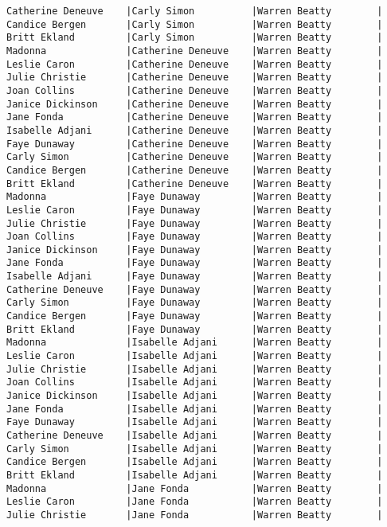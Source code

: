 \documentclass{article}
\begin{document}
\begin{verbatim}
Catherine Deneuve    |Carly Simon          |Warren Beatty        |
Candice Bergen       |Carly Simon          |Warren Beatty        |
Britt Ekland         |Carly Simon          |Warren Beatty        |
Madonna              |Catherine Deneuve    |Warren Beatty        |
Leslie Caron         |Catherine Deneuve    |Warren Beatty        |
Julie Christie       |Catherine Deneuve    |Warren Beatty        |
Joan Collins         |Catherine Deneuve    |Warren Beatty        |
Janice Dickinson     |Catherine Deneuve    |Warren Beatty        |
Jane Fonda           |Catherine Deneuve    |Warren Beatty        |
Isabelle Adjani      |Catherine Deneuve    |Warren Beatty        |
Faye Dunaway         |Catherine Deneuve    |Warren Beatty        |
Carly Simon          |Catherine Deneuve    |Warren Beatty        |
Candice Bergen       |Catherine Deneuve    |Warren Beatty        |
Britt Ekland         |Catherine Deneuve    |Warren Beatty        |
Madonna              |Faye Dunaway         |Warren Beatty        |
Leslie Caron         |Faye Dunaway         |Warren Beatty        |
Julie Christie       |Faye Dunaway         |Warren Beatty        |
Joan Collins         |Faye Dunaway         |Warren Beatty        |
Janice Dickinson     |Faye Dunaway         |Warren Beatty        |
Jane Fonda           |Faye Dunaway         |Warren Beatty        |
Isabelle Adjani      |Faye Dunaway         |Warren Beatty        |
Catherine Deneuve    |Faye Dunaway         |Warren Beatty        |
Carly Simon          |Faye Dunaway         |Warren Beatty        |
Candice Bergen       |Faye Dunaway         |Warren Beatty        |
Britt Ekland         |Faye Dunaway         |Warren Beatty        |
Madonna              |Isabelle Adjani      |Warren Beatty        |
Leslie Caron         |Isabelle Adjani      |Warren Beatty        |
Julie Christie       |Isabelle Adjani      |Warren Beatty        |
Joan Collins         |Isabelle Adjani      |Warren Beatty        |
Janice Dickinson     |Isabelle Adjani      |Warren Beatty        |
Jane Fonda           |Isabelle Adjani      |Warren Beatty        |
Faye Dunaway         |Isabelle Adjani      |Warren Beatty        |
Catherine Deneuve    |Isabelle Adjani      |Warren Beatty        |
Carly Simon          |Isabelle Adjani      |Warren Beatty        |
Candice Bergen       |Isabelle Adjani      |Warren Beatty        |
Britt Ekland         |Isabelle Adjani      |Warren Beatty        |
Madonna              |Jane Fonda           |Warren Beatty        |
Leslie Caron         |Jane Fonda           |Warren Beatty        |
Julie Christie       |Jane Fonda           |Warren Beatty        |

\end{verbatim}
\end{document}
